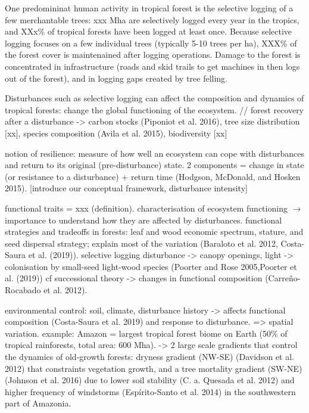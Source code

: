 \documentclass[]{elsarticle} %
\begin{document}
One predomininat human activity in tropical forest is the selective
logging of a few merchantable trees: xxx Mha are selectively logged
every year in the tropics, and XXx\% of tropical forests have been
logged at least once. Because selective logging focuses on a few
individual trees (typically 5-10 trees per ha), XXX\% of the forest
cover is maintenained after logging operations. Damage to the forest is
concentrated in infrastructure (roads and skid trails to get machines in
then logs out of the forest), and in logging gaps created by tree
felling.

Disturbances such as selective logging can affect the composition and
dynamics of tropical forests: change the global functioning of the
ecosystem. // forest recovery after a disturbance -\textgreater{} carbon
stocks (Piponiot et al. 2016), tree size distribution {[}xx{]}, species
composition (Avila et al. 2015), biodiversity {[}xx{]}

notion of resilience: measure of how well an ecosystem can cope with
disturbances and return to its original (pre-disturbance) state. 2
components = change in state (or resistance to a disturbance) + return
time (Hodgson, McDonald, and Hosken 2015). {[}introduce our conceptual
framework, disturbance intensity{]}

functional traits = xxx (definition). characterisation of ecosystem
functioning \(\rightarrow\) importance to understand how they are
affected by disturbances. functional strategies and tradeoffs in
forests: leaf and wood economic spectrum, stature, and seed dispersal
strategy; explain most of the variation (Baraloto et al. 2012,
Costa-Saura et al. (2019)). selective logging disturbance
-\textgreater{} canopy openings, light -\textgreater{} colonisation by
small-seed light-wood species (Poorter and Rose 2005,Poorter et al.
(2019)) cf successional theory -\textgreater{} changes in functional
composition (Carreño-Rocabado et al. 2012).

environmental control: soil, climate, disturbance history
-\textgreater{} affects functional composition (Costa-Saura et al. 2019)
and response to disturbance. =\textgreater{} spatial variation. example:
Amazon = largest tropical forest biome on Earth (50\% of tropical
rainforests, total area: 600 Mha). -\textgreater{} 2 large scale
gradients that control the dynamics of old-growth forests: dryness
gradient (NW-SE) (Davidson et al. 2012) that constraints vegetation
growth, and a tree mortality gradient (SW-NE) (Johnson et al. 2016) due
to lower soil stability (C. a. Quesada et al. 2012) and higher frequency
of windstorms (Espírito-Santo et al. 2014) in the southwestern part of
Amazonia.
\end{document}
